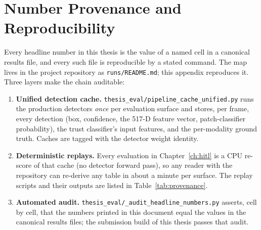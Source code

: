 \chapter{Number Provenance and Reproducibility}
\label{app:provenance}

Every headline number in this thesis is the value of a named cell in a canonical results file, and every such file is reproducible by a stated command. The map lives in the project repository as \texttt{runs/README.md}; this appendix reproduces it. Three layers make the chain auditable:

\begin{enumerate}
    \item \textbf{Unified detection cache.} \texttt{thesis\_eval/pipeline\_cache\_unified.py} runs the production detectors \emph{once} per evaluation surface and stores, per frame, every detection (box, confidence, the 517-D feature vector, patch-classifier probability), the trust classifier's input features, and the per-modality ground truth. Caches are tagged with the detector weight identity.
    \item \textbf{Deterministic replays.} Every evaluation in Chapter~\ref{ch:hitl} is a CPU re-score of that cache (no detector forward pass), so any reader with the repository can re-derive any table in about a minute per surface. The replay scripts and their outputs are listed in Table~\ref{tab:provenance}.
    \item \textbf{Automated audit.} \texttt{thesis\_eval/\_audit\_headline\_numbers.py} asserts, cell by cell, that the numbers printed in this document equal the values in the canonical results files; the submission build of this thesis passes that audit.
\end{enumerate}

